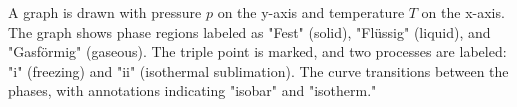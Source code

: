 A graph is drawn with pressure \( p \) on the y-axis and temperature \( T \) on the x-axis. The graph shows phase regions labeled as "Fest" (solid), "Flüssig" (liquid), and "Gasförmig" (gaseous). The triple point is marked, and two processes are labeled: "i" (freezing) and "ii" (isothermal sublimation). The curve transitions between the phases, with annotations indicating "isobar" and "isotherm."